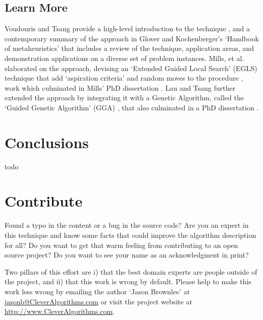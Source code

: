 \documentclass[a4paper, 11pt]{article}
\makeatletter
\newcommand{\myreportauthor}{Jason Brownlee}
\newcommand{\myreportemail}{jasonb@CleverAlgorithms.com}
\newcommand{\myreportwebsite}{http://www.CleverAlgorithms.com}
\makeatother
\begin{document}
% 
% 
\subsection{Learn More}
Voudouris and Tsang provide a high-level introduction to the technique \cite{Voudouris1998}, and a contemporary summary of the approach in Glover and Kochenberger's `Handbook of metaheuristics' \cite{Glover2003a} that includes a review of the technique, application areas, and demonstration applications on a diverse set of problem instances.
Mills, et al. elaborated on the approach, devising an `Extended Guided Local Search' (EGLS) technique that add `aspiration criteria' and random moves to the procedure \cite{Mills2003}, work which culminated in Mills' PhD dissertation \cite{Mills2002}.  
Lau and Tsang further extended the approach by integrating it with a Genetic Algorithm, called the `Guided Genetic Algorithm' (GGA) \cite{Lau1998}, that also culminated in a PhD dissertation \cite{Lau1999}.

% 
% 
\section{Conclusions}
\label{sec:conclusions}
todo

% 
% 
\section{Contribute}
\label{sec:contribute}
Found a typo in the content or a bug in the source code? 
Are you an expert in this technique and know some facts that could improve the algorithm description for all?
Do you want to get that warm feeling from contributing to an open source project? 
Do you want to see your name as an acknowledgment in print?

Two pillars of this effort are i) that the best domain experts are people outside of the project, and ii) that this work is wrong by default. 
Please help to make this work less wrong by emailing the author `\myreportauthor' at \url{\myreportemail} or visit the project website at \url{\myreportwebsite}.



\end{document}
